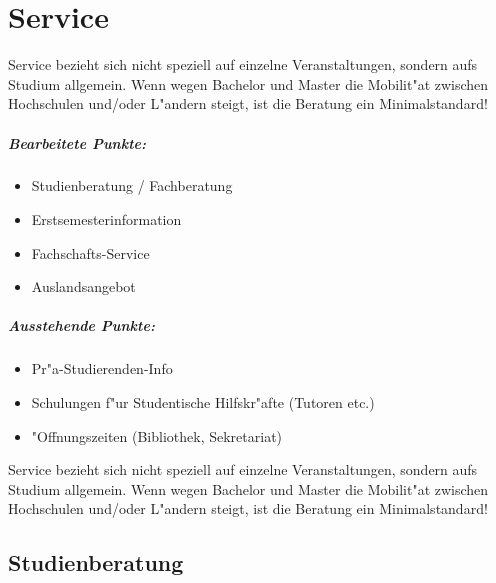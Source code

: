 \chapter{Service}
\label{l.service}

\begin{kcmt62}
\begin{komacmt62}
	Service bezieht sich nicht speziell auf einzelne Veranstaltungen, sondern
	aufs Studium allgemein. Wenn wegen Bachelor und Master die Mobilit"at
	zwischen Hochschulen und/oder L"andern steigt, ist die Beratung ein
	Minimalstandard!

\end{komacmt62}
\end{kcmt62}
\begin{kcmt}\begin{komacmt}
	\paragraph{Bearbeitete Punkte:}
	\begin{itemize}
		\item Studienberatung / Fachberatung
		\item Erstsemesterinformation
		\item Fachschafts-Service
		\item Auslandsangebot
	\end{itemize}

	\paragraph{Ausstehende Punkte:}
	\begin{itemize}
		\item Pr"a-Studierenden-Info
		\item Schulungen f"ur Studentische Hilfskr"afte (Tutoren etc.)
		\item "Offnungszeiten (Bibliothek, Sekretariat)
	\end{itemize}

	Service bezieht sich nicht speziell auf einzelne Veranstaltungen, sondern
	aufs Studium allgemein. Wenn wegen Bachelor und Master die Mobilit"at
	zwischen Hochschulen und/oder L"andern steigt, ist die Beratung ein
	Minimalstandard!
\end{komacmt}\end{kcmt}

\section{Studienberatung}

